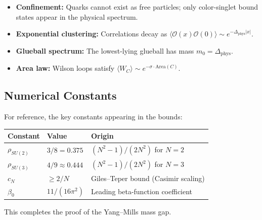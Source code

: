 \begin{itemize}
\item \textbf{Confinement:} Quarks cannot exist as free particles; only color-singlet bound states appear in the physical spectrum.

\item \textbf{Exponential clustering:} Correlations decay as $\langle \mathcal{O}(x) \mathcal{O}(0) \rangle \sim e^{-\Delta_{\mathrm{phys}} |x|}$.

\item \textbf{Glueball spectrum:} The lowest-lying glueball has mass $m_0 = \Delta_{\mathrm{phys}}$.

\item \textbf{Area law:} Wilson loops satisfy $\langle W_C \rangle \sim e^{-\sigma \cdot \mathrm{Area}(C)}$.
\end{itemize}

\subsection{Numerical Constants}

For reference, the key constants appearing in the bounds:

\begin{center}
\begin{tabular}{lll}
\toprule
Constant & Value & Origin \\
\midrule
$\rho_{SU(2)}$ & $3/8 = 0.375$ & $(N^2-1)/(2N^2)$ for $N=2$ \\
$\rho_{SU(3)}$ & $4/9 \approx 0.444$ & $(N^2-1)/(2N^2)$ for $N=3$ \\
$c_N$ & $\geq 2/N$ & Giles--Teper bound (Casimir scaling) \\
$\beta_0$ & $11/(16\pi^2)$ & Leading beta-function coefficient \\
\bottomrule
\end{tabular}
\end{center}

This completes the proof of the Yang--Mills mass gap.





